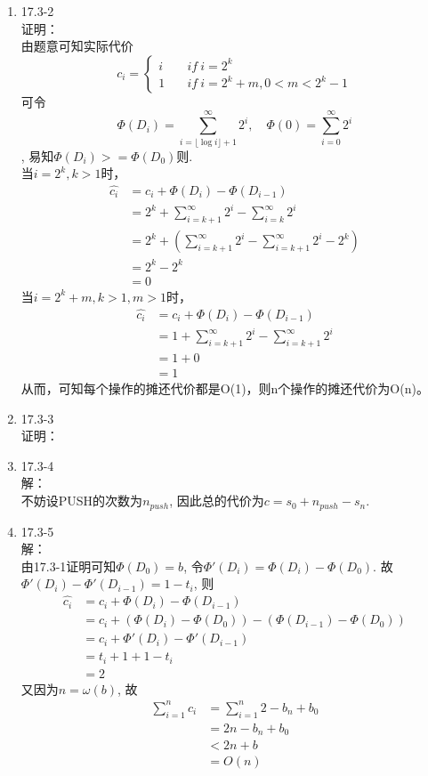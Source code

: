 \documentclass[UTF8]{ctexart}
\begin{document}
\begin{enumerate}
	\item 17.3-2	\\
	证明：\\
	由题意可知实际代价
	\[
		c_i = \left\{
		\begin{aligned}
			i	&\quad if \ i = 2^k	\\
			1	&\quad if \	i = 2^k+m, 0<m<2^k-1
		\end{aligned}
		\right.
	\]
	可令
	\[
		\Phi(D_i) = \sum_{i=\lfloor\log{i}\rfloor+1}^{\infty} 2^i,\quad \Phi(0) = \sum_{i=0}^{\infty} 2^i
	\]
	, 易知$\Phi(D_i) >= \Phi(D_0)$则. \\
	当$i=2^k, k>1$时，
	\begin{align*}
		\hat{c_i}	&= c_i + \Phi(D_i) - \Phi(D_{i-1})							\\
					&= 2^k + \sum_{i=k+1}^{\infty}2^i - \sum_{i=k}^{\infty}2^i				\\
					&= 2^k + (\sum_{i=k+1}^{\infty}2^i - \sum_{i=k+1}^{\infty}2^i - 2^k)	\\
					&= 2^k - 2^k												\\
					&= 0
	\end{align*}
	当$i=2^k+m, k>1, m>1$时，
	\begin{align*}
		\hat{c_i}	&= c_i + \Phi(D_i) - \Phi(D_{i-1})	\\
					&= 1 + \sum_{i=k+1}^{\infty}2^i - \sum_{i=k+1}^{\infty}2^i	\\
					&= 1 + 0	\\
					&= 1
	\end{align*}
	从而，可知每个操作的摊还代价都是O(1)，则n个操作的摊还代价为O(n)。
	
	\item 17.3-3	\\
	证明：\\
	
	\item 17.3-4 \\
	解：\\
	不妨设PUSH的次数为$n_{push}$, 因此总的代价为$c = s_0 + n_{push} - s_n$.
	
	\item 17.3-5 \\
	解：\\
	由17.3-1证明可知$\Phi(D_0) = b$, 令$\Phi'(D_i) = \Phi(D_i) - \Phi(D_0)$. 故$\Phi'(D_i) - \Phi'(D_{i-1}) = 1 - t_i$, 则\\
	\begin{align*}
		\hat{c_i}	&= c_i + \Phi(D_i) - \Phi(D_{i-1})	\\
					&= c_i + (\Phi(D_i) - \Phi(D_0)) - (\Phi(D_{i-1}) - \Phi(D_0))	\\
					&= c_i + \Phi'(D_i) - \Phi'(D_{i-1})	\\
					&= t_i + 1 + 1 - t_i	\\
					&= 2
	\end{align*}
	又因为$n = \omega(b)$, 故
	\begin{align*}
		\sum_{i=1}^n c_i	&= \sum_{i=1}^n 2 - b_n + b_0	\\
							&= 2n - b_n + b_0	\\
							&< 2n + b	\\
							&= O(n)
	\end{align*}
	

\end{enumerate}
\end{document}
